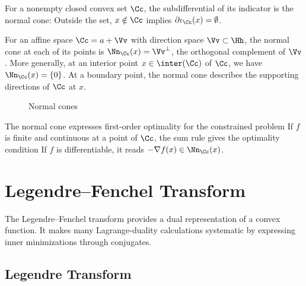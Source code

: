 For a nonempty closed convex set $\Cc$, the subdifferential of its indicator is the normal cone:
Outside the set, $x \notin \Cc$ implies $\partial  \iota_\Cc(x) = \emptyset$.
 
For an affine space $\Cc = a+\Vv$ with direction space $\Vv \subset \Hh$, the normal cone at each of its points is $\Nn_\Cc(x)=\Vv^\bot$, the orthogonal complement of $\Vv$. More generally, at an interior point $x \in \inter(\Cc)$ of $\Cc$, we have $\Nn_\Cc(x)=\{0\}$. At a boundary point, the normal cone describes the supporting directions of $\Cc$ at $x$.






\begin{figure}[tbp]
\centering
{}
\caption{Normal cones}
\label{fig-review-convex-analysis-normal-cones}
\end{figure}
The normal cone expresses first-order optimality for the constrained problem
If $f$ is finite and continuous at a point of $\Cc$, the sum rule gives the optimality condition
If $f$ is differentiable, it reads $-\nabla f(x) \in \Nn_\Cc(x)$.



                                                                                  
                                                                                  
                                                                                  
\section{Legendre--Fenchel Transform}

The Legendre--Fenchel transform provides a dual representation of a convex function. It makes many Lagrange-duality calculations systematic by expressing inner minimizations through conjugates.

                                                                                  
\subsection{Legendre Transform}

